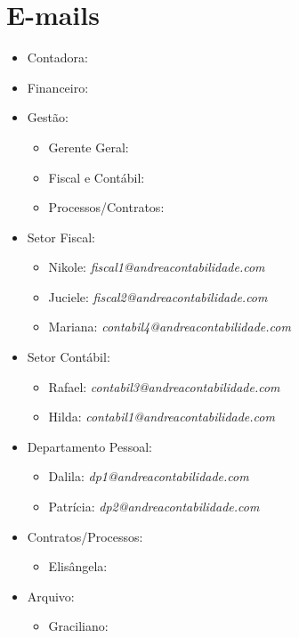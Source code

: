 \documentclass{article}
\makeatletter
\newcommand{\at}[1]{\textit{#1@andreacontabilidade.com}}
\newcommand{\emailcontabilum}{\at{contabil1}}
\newcommand{\emailcontabiltres}{\at{contabil3}}
\newcommand{\emailcontabilquatro}{\at{contabil4}}
\newcommand{\emailfiscalum}{\at{fiscal1}}
\newcommand{\emailfiscaldois}{\at{fiscal2}}
\newcommand{\emaildpum}{\at{dp1}}
\newcommand{\emaildpdois}{\at{dp2}}
\makeatother
\begin{document}
\section{E-mails}
\begin{itemize}
  \item Contadora: \emailandrea
  \item Financeiro: \emailabelardo
  \item Gestão:
  \begin{itemize}
    \item Gerente Geral: \emaildanielle
    \item Fiscal e Contábil: \emaildebora
    \item Processos/Contratos: \emailnatalia
  \end{itemize}
  \item Setor Fiscal:
  \begin{itemize}
    \item Nikole: \emailfiscalum
    \item Juciele: \emailfiscaldois
    \item Mariana: \emailcontabilquatro
  \end{itemize}
  \item Setor Contábil:
  \begin{itemize}
    \item Rafael: \emailcontabiltres
    \item Hilda: \emailcontabilum
  \end{itemize}
  \item Departamento Pessoal:
  \begin{itemize}
    \item Dalila: \emaildpum
    \item Patrícia: \emaildpdois
  \end{itemize}
  \item Contratos/Processos:
  \begin{itemize}
    \item Elisângela: \emailprocessos 
  \end{itemize}
  \item Arquivo:
  \begin{itemize}
    \item Graciliano: \emailarquivo
  \end{itemize}
\end{itemize}
\end{document}
